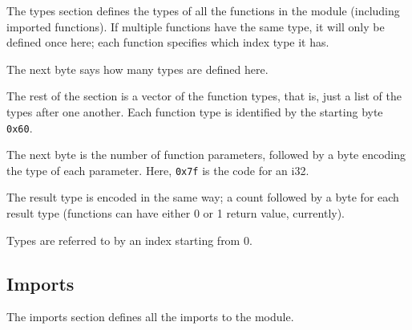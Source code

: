\documentclass[10pt,a4paper]{article}
\begin{document}


The types section defines the types of all the functions in the module (including imported functions).
If multiple functions have the same type, it will only be defined once here; each function specifies which index type it has.

The next byte says how many types are defined here.



The rest of the section is a vector of the function types, that is, just a list of the types after one another.
Each function type is identified by the starting byte \texttt{0x60}.

The next byte is the number of function parameters, followed by a byte encoding the type of each parameter. Here, \texttt{0x7f} is the code for an \textsf{i32}.

The result type is encoded in the same way; a count followed by a byte for each result type (functions can have either 0 or 1 return value, currently).

Types are referred to by an index starting from 0.











\subsection*{Imports}

The imports section defines all the imports to the module.


\end{document}
